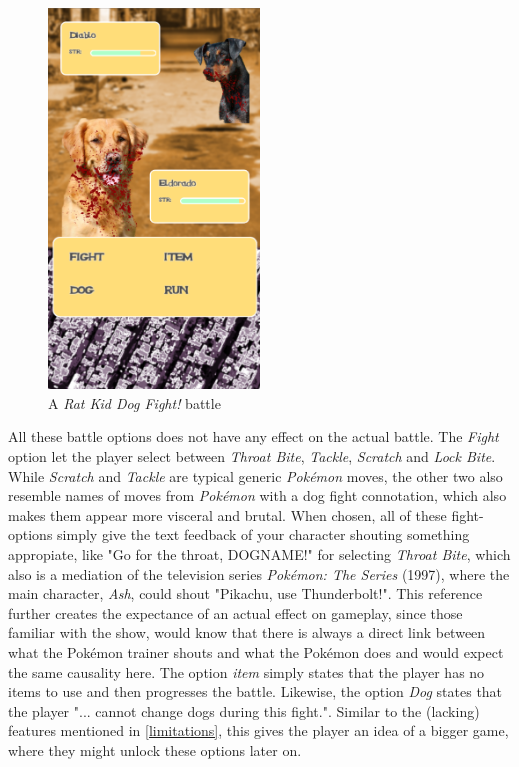 \begin{figure}[h!]
	\centering
    \includegraphics[width=0.5\textwidth]{battle.png}
    \caption{A \textit{Rat Kid Dog Fight!} battle}
    \label{fig:DogFightBattle}
\end{figure}

All these battle options does not have any effect on the actual battle. The \textit{Fight} option let the player select between \textit{Throat Bite}, \textit{Tackle}, \textit{Scratch} and \textit{Lock Bite}. While \textit{Scratch} and \textit{Tackle} are typical generic \textit{Pokémon} moves, the other two also resemble names of moves from \textit{Pokémon} with a dog fight connotation, which also makes them appear more visceral and brutal. When chosen, all of these fight-options simply give the text feedback of your character shouting something appropiate, like "Go for the throat, DOGNAME!" for selecting \textit{Throat Bite}, which also is a mediation of the television series \textit{Pokémon: The Series} (1997), where the main character, \textit{Ash}, could shout "Pikachu, use Thunderbolt!". This reference further creates the expectance of an actual effect on gameplay, since those familiar with the show, would know that there is always a direct link between what the Pokémon trainer shouts and what the Pokémon does and would expect the same causality here.
The option \textit{item} simply states that the player has no items to use and then progresses the battle. Likewise, the option \textit{Dog} states that the player "... cannot change dogs during this fight.". Similar to the (lacking) features mentioned in \ref{limitations}, this gives the player an idea of a bigger game, where they might unlock these options later on.\


